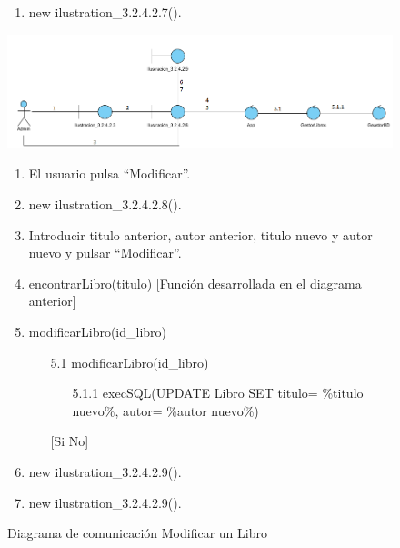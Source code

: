 ﻿\documentclass{report}
\begin{document}
\begin{figure}[H]
\begin{enumerate}
\begin{enumerate}
\begin{enumerate}
                            \item[5.1.2] execSQL( DELETE * FROM CopiaLibro WHERE id\_libro= libroBuscado) 
                            \item[5.1.3] execSQL( DELETE * FROM Libro WHERE id\_libro= libroBuscado) 
                        \end{enumerate}
                \end{enumerate}
                    [Si No]
                \item new ilustration\_3.2.4.2.7().
            \end{enumerate}
            \end{figure}
            \clearpage

        \begin{figure}[H]
                \centering
                \includegraphics[width=1.1\textwidth]{img/comunicacion/diagrama6.png}
                \caption{Diagrama de comunicación Modificar un Libro}
            \clearpage
            \begin{enumerate}
                \item El usuario pulsa ``Modificar''.
                \item new ilustration\_3.2.4.2.8().
                \item Introducir titulo anterior, autor anterior, titulo nuevo y autor nuevo y pulsar ``Modificar''.
                \item encontrarLibro(titulo) [Función desarrollada en el diagrama anterior]
                \newline
                [SI libroBuscado != NULL]
                \item modificarLibro(id\_libro)
                \begin{enumerate}
                    \item[5.1] modificarLibro(id\_libro)
                        \begin{enumerate}
                            \item[5.1.1] execSQL(UPDATE Libro SET titulo= \%titulo nuevo\%, autor= \%autor nuevo\%)
                        \end{enumerate}
                    [Si No]
                \end{enumerate}
                \item new ilustration\_3.2.4.2.9().
                \newline
                [Si No]
                \item new ilustration\_3.2.4.2.9().
            \end{enumerate}
            \end{figure}
            \clearpage
\end{document}
